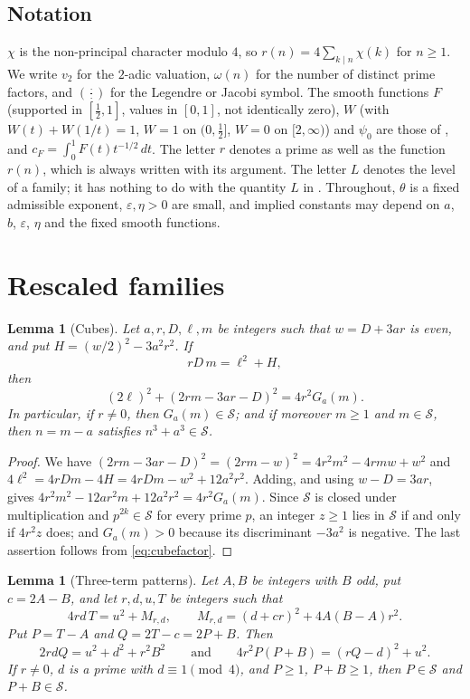 \documentclass[11pt]{amsart}
\newtheorem{lemma}[theorem]{Lemma}
\theoremstyle{remark}
\theoremstyle{definition}
\numberwithin{equation}{section}
\newcommand{\Sc}{\mathcal{S}}
\newcommand{\eps}{\varepsilon}
\newcommand{\leg}[2]{\left(\frac{#1}{#2}\right)}
\begin{document}
\subsection*{Notation}
$\chi$ is the non-principal character modulo $4$, so $r(n)=4\sum_{k\mid n}\chi(k)$ for $n\ge1$. We write $v_2$ for the $2$-adic valuation, $\omega(n)$ for the number of distinct prime factors, and $\leg{\cdot}{\cdot}$ for the Legendre or Jacobi symbol. The smooth functions $F$ (supported in $[\frac12,1]$, values in $[0,1]$, not identically zero), $W$ (with $W(t)+W(1/t)=1$, $W=1$ on $(0,\frac12]$, $W=0$ on $[2,\infty)$) and $\psi_0$ are those of \cite[\S\S4,5,7]{IC}, and $c_F=\int_0^1F(t)t^{-1/2}\,dt$. The letter $r$ denotes a prime as well as the function $r(n)$, which is always written with its argument. The letter $L$ denotes the level of a family; it has nothing to do with the quantity $L$ in \cite[\S\S9--12]{IC}. Throughout, $\theta$ is a fixed admissible exponent, $\eps,\eta>0$ are small, and implied constants may depend on $a$, $b$, $\eps$, $\eta$ and the fixed smooth functions.

\section{Rescaled families}\label{sec:families}

\begin{lemma}[Cubes]\label{lem:cubes}
Let $a,r,D,\ell,m$ be integers such that $w=D+3ar$ is even, and put $H=(w/2)^2-3a^2r^2$. If
\[
rD\,m=\ell^2+H,
\]
then
\begin{equation}\label{eq:cubeid}
(2\ell)^2+(2rm-3ar-D)^2=4r^2G_a(m).
\end{equation}
In particular, if $r\ne0$, then $G_a(m)\in\Sc$; and if moreover $m\ge1$ and $m\in\Sc$, then $n=m-a$ satisfies $n^3+a^3\in\Sc$.
\end{lemma}

\begin{proof}
We have $(2rm-3ar-D)^2=(2rm-w)^2=4r^2m^2-4rmw+w^2$ and $4\ell^2=4rDm-4H=4rDm-w^2+12a^2r^2$. Adding, and using $w-D=3ar$, gives $4r^2m^2-12ar^2m+12a^2r^2=4r^2G_a(m)$. Since $\Sc$ is closed under multiplication and $p^{2k}\in\Sc$ for every prime $p$, an integer $z\ge1$ lies in $\Sc$ if and only if $4r^2z$ does; and $G_a(m)>0$ because its discriminant $-3a^2$ is negative. The last assertion follows from \eqref{eq:cubefactor}.
\end{proof}

\begin{lemma}[Three-term patterns]\label{lem:triples}
Let $A,B$ be integers with $B$ odd, put $c=2A-B$, and let $r,d,u,T$ be integers such that
\[
4rd\,T=u^2+M_{r,d},\qquad M_{r,d}=(d+cr)^2+4A(B-A)r^2 .
\]
Put $P=T-A$ and $Q=2T-c=2P+B$. Then
\[
2rdQ=u^2+d^2+r^2B^2\qquad\text{and}\qquad4r^2P(P+B)=(rQ-d)^2+u^2 .
\]
If $r\ne0$, $d$ is a prime with $d\equiv1\pmod 4$, and $P\ge1$, $P+B\ge1$, then $P\in\Sc$ and $P+B\in\Sc$.
\end{lemma}
\end{document}
